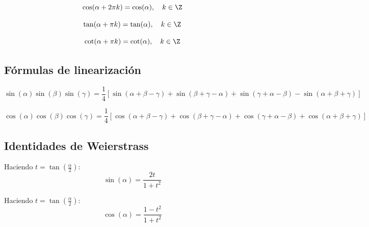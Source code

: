 \begin{proposición}
$$\cos(\alpha + 2\pi k) = \cos(\alpha), \quad k \in \Z$$
\end{proposición}

\begin{proposición}
$$\tan(\alpha + \pi k) = \tan(\alpha), \quad k \in \Z$$
\end{proposición}

\begin{proposición}
$$\cot(\alpha + \pi k) = \cot(\alpha), \quad k \in \Z$$
\end{proposición}

\subsection{Fórmulas de linearización}

\begin{proposición}
$$\sin(\alpha)\sin(\beta)\sin(\gamma) = \frac{1}{4}\left[\sin(\alpha + \beta - \gamma) + \sin(\beta + \gamma - \alpha) + \sin(\gamma + \alpha - \beta) - \sin(\alpha + \beta + \gamma)\right]$$
\end{proposición}

\begin{proposición}
$$\cos(\alpha)\cos(\beta)\cos(\gamma) = \frac{1}{4}\left[\cos(\alpha + \beta - \gamma) + \cos(\beta + \gamma - \alpha) + \cos(\gamma + \alpha - \beta) + \cos(\alpha + \beta + \gamma)\right]$$
\end{proposición}

\subsection{Identidades de Weierstrass}

\begin{proposición}
Haciendo $t = \tan\left(\frac{\alpha}{2}\right)$:
$$\sin(\alpha) = \frac{2t}{1 + t^2}$$
\end{proposición}

\begin{proposición}
Haciendo $t = \tan\left(\frac{\alpha}{2}\right)$:
$$\cos(\alpha) = \frac{1 - t^2}{1 + t^2}$$
\end{proposición}

